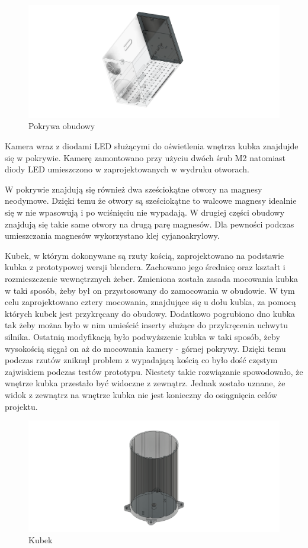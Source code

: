 \begin{figure}[H]
    \centering
    \includegraphics[width=0.95\linewidth]{chapters/03-praca-wlasna/figures/pokrywa.png}
    \caption{\label{fig:pokrywa}Pokrywa obudowy}
\end{figure}

Kamera wraz z diodami LED służącymi do oświetlenia wnętrza kubka znajdujde się w pokrywie. Kamerę zamontowano przy użyciu dwóch śrub M2 natomiast
diody LED umieszczono w zaprojektowanych w wydruku otworach.

W pokrywie znajdują się również dwa sześciokątne otwory na magnesy neodymowe. Dzięki temu że otwory są sześciokątne to walcowe magnesy idealnie
się w nie wpasowują i po wciśnięciu nie wypadają. W drugiej części obudowy znajdują się takie same otwory na drugą parę magnesów. Dla pewności podczas umieszczania magnesów 
wykorzystano klej cyjanoakrylowy.

Kubek, w którym dokonywane są rzuty kością, zaprojektowano na podstawie kubka z prototypowej wersji blendera. Zachowano jego średnicę oraz kształt i rozmieszczenie wewnętrznych
żeber. Zmieniona została zasada mocowania kubka w taki sposób, żeby był on przystosowany do zamocowania w obudowie. W tym celu zaprojektowano
cztery mocowania, znajdujące się u dołu kubka, za pomocą których kubek jest przykręcany do obudowy. Dodatkowo pogrubiono dno kubka tak żeby można było w nim umieścić inserty służące 
do przykręcenia uchwytu silnika. Ostatnią modyfikacją było podwyższenie kubka w taki sposób, żeby wysokością sięgał on aż do mocowania kamery - górnej pokrywy.
Dzięki temu podczas rzutów zniknął problem z wypadającą kością co było dość częstym zajwiskiem podczas testów prototypu. Niestety takie rozwiązanie
spowodowało, że wnętrze kubka przestało być widoczne z zewnątrz. Jednak zostało uznane, że widok z zewnątrz na wnętrze kubka nie jest konieczny do osiągnięcia celów projektu.

\begin{figure}[H]
    \centering
    \includegraphics[width=0.95\linewidth]{chapters/03-praca-wlasna/figures/kubek.png}
    \caption{\label{fig:kubek}Kubek}
\end{figure}

